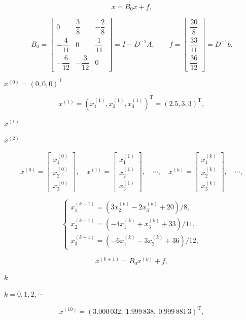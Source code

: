 \documentclass[UTF8,fontset=fandol]{ctexart}
\begin{document}
\[
x=B_0x+f,
\]

\[
B_0=\begin{bmatrix}
0&\dfrac38&-\dfrac28\\[4pt]
-\dfrac4{11}&0&\dfrac1{11}\\[4pt]
-\dfrac6{12}&-\dfrac3{12}&0
\end{bmatrix}=I-D^{-1}A,\qquad
f=\begin{bmatrix}\dfrac{20}8\\[4pt]\dfrac{33}{11}\\[4pt]\dfrac{36}{12}\end{bmatrix}=D^{-1}b.
\]

$x^{(0)}=(0,0,0)^{\mathrm T}$\par

\[
x^{(1)}=(x_1^{(1)},x_2^{(1)},x_3^{(1)})^{\mathrm T}=(2.5,3,3)^{\mathrm T},
\]

$x^{(1)}$\par

$x^{(2)}$\par

\[
x^{(0)}=\begin{bmatrix}x_1^{(0)}\\x_2^{(0)}\\x_3^{(0)}\end{bmatrix},\quad
x^{(1)}=\begin{bmatrix}x_1^{(1)}\\x_2^{(1)}\\x_3^{(1)}\end{bmatrix},\quad\cdots,\quad
x^{(k)}=\begin{bmatrix}x_1^{(k)}\\x_2^{(k)}\\x_3^{(k)}\end{bmatrix},\quad\cdots,
\]

\[
\begin{cases}
x_1^{(k+1)}=(3x_2^{(k)}-2x_3^{(k)}+20)/8,\\
x_2^{(k+1)}=(-4x_1^{(k)}+x_3^{(k)}+33)/11,\\
x_3^{(k+1)}=(-6x_1^{(k)}-3x_2^{(k)}+36)/12,
\end{cases}
\tag{8.1.4}
\]

\[
x^{(k+1)}=B_0x^{(k)}+f,
\]

$k$\par

$k=0,1,2,\cdots$\par

\[
x^{(10)}=(3.000\,032,\ 1.999\,838,\ 0.999\,881\,3)^{\mathrm T},
\]
\end{document}
